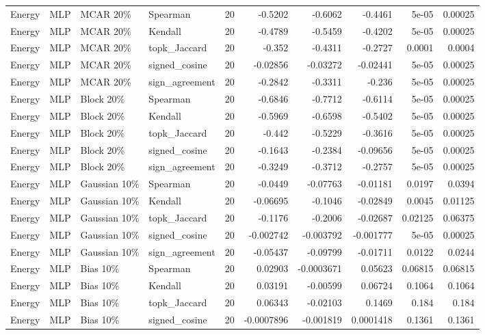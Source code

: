 \begin{tabular}{llllrrrrrr}
Energy & MLP & MCAR 20\% & Spearman & 20 & -0.5202 & -0.6062 & -0.4461 & 5e-05 & 0.00025 \\
Energy & MLP & MCAR 20\% & Kendall & 20 & -0.4789 & -0.5459 & -0.4202 & 5e-05 & 0.00025 \\
Energy & MLP & MCAR 20\% & topk\_Jaccard & 20 & -0.352 & -0.4311 & -0.2727 & 0.0001 & 0.0004 \\
Energy & MLP & MCAR 20\% & signed\_cosine & 20 & -0.02856 & -0.03272 & -0.02441 & 5e-05 & 0.00025 \\
Energy & MLP & MCAR 20\% & sign\_agreement & 20 & -0.2842 & -0.3311 & -0.236 & 5e-05 & 0.00025 \\
Energy & MLP & Block 20\% & Spearman & 20 & -0.6846 & -0.7712 & -0.6114 & 5e-05 & 0.00025 \\
Energy & MLP & Block 20\% & Kendall & 20 & -0.5969 & -0.6598 & -0.5402 & 5e-05 & 0.00025 \\
Energy & MLP & Block 20\% & topk\_Jaccard & 20 & -0.442 & -0.5229 & -0.3616 & 5e-05 & 0.00025 \\
Energy & MLP & Block 20\% & signed\_cosine & 20 & -0.1643 & -0.2384 & -0.09656 & 5e-05 & 0.00025 \\
Energy & MLP & Block 20\% & sign\_agreement & 20 & -0.3249 & -0.3712 & -0.2757 & 5e-05 & 0.00025 \\
Energy & MLP & Gaussian 10\% & Spearman & 20 & -0.0449 & -0.07763 & -0.01181 & 0.0197 & 0.0394 \\
Energy & MLP & Gaussian 10\% & Kendall & 20 & -0.06695 & -0.1046 & -0.02849 & 0.0045 & 0.01125 \\
Energy & MLP & Gaussian 10\% & topk\_Jaccard & 20 & -0.1176 & -0.2006 & -0.02687 & 0.02125 & 0.06375 \\
Energy & MLP & Gaussian 10\% & signed\_cosine & 20 & -0.002742 & -0.003792 & -0.001777 & 5e-05 & 0.00025 \\
Energy & MLP & Gaussian 10\% & sign\_agreement & 20 & -0.05437 & -0.09799 & -0.01711 & 0.0122 & 0.0244 \\
Energy & MLP & Bias 10\% & Spearman & 20 & 0.02903 & -0.0003671 & 0.05623 & 0.06815 & 0.06815 \\
Energy & MLP & Bias 10\% & Kendall & 20 & 0.03191 & -0.00599 & 0.06724 & 0.1064 & 0.1064 \\
Energy & MLP & Bias 10\% & topk\_Jaccard & 20 & 0.06343 & -0.02103 & 0.1469 & 0.184 & 0.184 \\
Energy & MLP & Bias 10\% & signed\_cosine & 20 & -0.0007896 & -0.001819 & 0.0001418 & 0.1361 & 0.1361 \\

\end{tabular}
